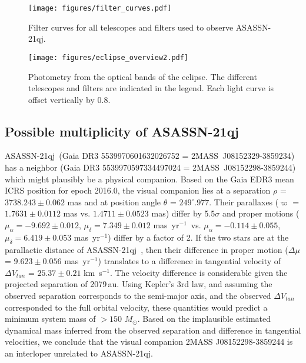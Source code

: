 \documentclass{aa}
\newcommand{\asas}{ASASSN-21qj}
\newcommand{\kms}{km~s$^{-1}$\xspace}
\newcommand{\masyr}{mas~yr$^{-1}$}
\newcommand{\msun}{$M_\odot$}
\begin{document}
\begin{figure}
   \begin{centering}
   \texttt{[image: figures/filter\_curves.pdf]}
      \caption{Filter curves for all telescopes and filters used to observe \asas.}
      \label{fig:allfilters}
      \end{centering}
\end{figure}


\begin{figure*}
   \begin{centering}
   \texttt{[image: figures/eclipse\_overview2.pdf]}
      \caption{Photometry from the optical bands of the eclipse.
The different telescopes and filters are indicated in the legend.
%
Each light curve is offset vertically by 0.8.
              }
        \label{fig:eclipse_overview}
    \end{centering}
\end{figure*}

\subsection{Possible multiplicity of \asas}

\asas\ (Gaia DR3 5539970601632026752 = 2MASS~J08152329-3859234) has a neighbor (Gaia DR3 5539970597334497024 = 2MASS~J08152298-3859244) which might plausibly be a physical companion.
%
Based on the Gaia EDR3 mean ICRS position for epoch 2016.0, the visual companion lies at a separation $\rho$ = $3738.243\pm0.062$ mas and at position angle $\theta$ = $249^{\circ}.977$.
%
Their parallaxes ($\varpi$ = $1.7631\pm0.0112$ mas vs. $1.4711\pm0.0523$ mas) differ by 5.5$\sigma$ and proper motions ($\mu_{\alpha} = -9.692\pm0.012$, $\mu_{\delta} = 7.349\pm0.012$ \masyr\, vs. $\mu_{\alpha} = -0.114\pm0.055$, $\mu_{\delta} = 6.419\pm0.053$ \masyr) differ by a factor of 2.
%
If the two stars are at the parallactic distance of \asas\ \citep[$d$ = 552.4 pc;][]{BailerJones21}, then their difference in proper motion ($\Delta\mu$ = $9.623\pm0.056$ \masyr) translates to a difference in tangential velocity of $\Delta V_{tan}$ = $25.37\pm0.21$ \kms.
%
The velocity difference is considerable given the projected separation of 2079\,au.
%
Using Kepler's 3rd law, and assuming the observed separation corresponds to the semi-major axis, and the observed $\Delta V_{tan}$ corresponded to the full orbital velocity, these quantities would predict a minimum system mass of $>150$ \msun.
%
Based on the implausible estimated dynamical mass inferred from the observed separation and difference in tangential velocities, we conclude that the visual companion 2MASS J08152298-3859244 is an interloper unrelated to \asas.
\end{document}
